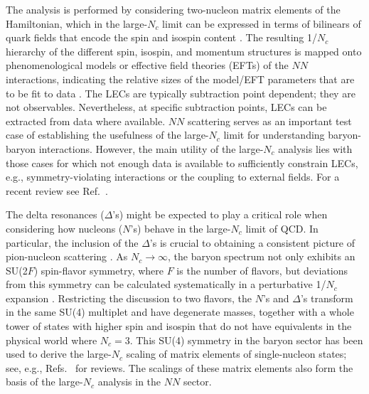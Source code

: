 \documentclass[nofootinbib, preprint, aps, prc, superscriptaddress,11pt]{revtex4-1}
\newcommand{\Nc}{\ensuremath{N_c}\xspace}
\newcommand{\NN}{\ensuremath{N\!N}\xspace}
\newcommand{\1}{\mathbbm{1}}
\newcommand{\D}{\ensuremath{\Delta}\xspace}
\begin{document}
The analysis is performed by considering two-nucleon matrix elements of the Hamiltonian,
which in the large-\Nc limit can be expressed in terms of bilinears of quark fields that encode the spin and isospin content \cite{Dashen:1993jt,Dashen:1994qi,Carone:1993dz,Luty:1993fu}.
The resulting 1/\Nc hierarchy of the different spin, isospin, and momentum structures is mapped onto
phenomenological models or effective field theories (EFTs) of the \NN interactions, indicating the relative sizes of the model/EFT parameters that are to be fit to data \cite{Kaplan:1996rk}.
The LECs are typically subtraction point dependent; they are not observables. Nevertheless, at specific subtraction points, LECs can be extracted from data where available. \NN scattering serves as an important test case of establishing the usefulness of the large-\Nc limit for understanding baryon-baryon interactions. However, the main utility of the large-\Nc analysis lies with those cases for which not enough data is available to sufficiently constrain LECs, e.g., symmetry-violating interactions or the coupling to external fields.
For a recent review see Ref.~\cite{Richardson:2022hyj}.


The delta resonances (\D's) might be expected to play a critical role when considering how nucleons ($N$'s) behave in the large-\Nc limit of QCD. 
In particular, the inclusion of the \D's is crucial to obtaining a consistent picture of pion-nucleon scattering \cite{Gervais:1983wq,Gervais:1984rc,Dashen:1993as}. 
As \Nc $\rightarrow \infty$, the baryon spectrum not only exhibits an SU(2$F$) spin-flavor symmetry, where $F$ is the number of flavors, but deviations from this symmetry can be calculated systematically in a perturbative 1/\Nc  expansion \cite{Gervais:1983wq,Gervais:1984rc,Dashen:1993as,Dashen:1993ac,Jenkins:1993af,Dashen:1993jt,Dashen:1994qi}. 
 Restricting the discussion to two flavors, the $N$'s and \D's transform in the same SU(4) multiplet and have degenerate masses, together with a whole tower of states with higher spin and isospin that do not have equivalents in the physical world where $\Nc = 3$. 
This SU(4) symmetry in the baryon sector has been used to derive the large-\Nc scaling of matrix elements of single-nucleon states; see, e.g., Refs.~\cite{Witten:1979kh,Coleman:1985rnk,Manohar:1998xv,Jenkins:1998wy,Lebed:1998st} for reviews.
The scalings of these matrix elements also form the basis of the large-\Nc analysis in the \NN sector.
\end{document}
